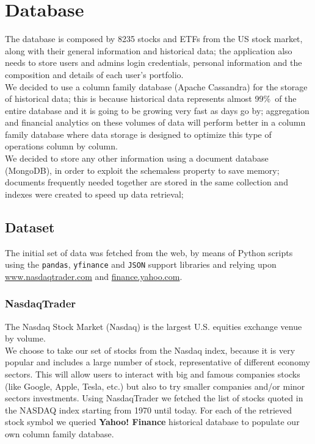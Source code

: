 \chapter{Database}
The database is composed by 8235 stocks and ETFs from the US stock market, along
with their general information and historical data; the application also needs to
store users and admins login credentials, personal information and the
composition and details of each user's portfolio.\\
We decided to use a column family database (Apache Cassandra) for the storage of
historical data; this is because historical data represents almost 99\%\ of
the entire database and it is going to be growing very fast as days go by;
aggregation and financial analytics on these volumes of data will perform better
in a column family database where data storage is designed to optimize this type
of operations column by column.\\
We decided to store any other information using a document database (MongoDB),
in order to exploit the schemaless property to save memory; documents frequently
needed together are stored in the same collection and indexes were created to
speed up data retrieval;
\section{Dataset}
The initial set of data was fetched from the web, by means of Python scripts
using the \texttt{pandas}, \texttt{yfinance} and \texttt{JSON} support libraries
and relying upon \url{www.nasdaqtrader.com} and \url{finance.yahoo.com}.
\subsection{NasdaqTrader}
The Nasdaq Stock Market (Nasdaq) is the largest U.S. equities exchange venue by
volume.\\
We choose to take our set of stocks from the Nasdaq index, because it is very
popular and includes a large number of stock, representative of different
economy sectors. This will allow users to interact with big and famous companies
stocks (like Google, Apple, Tesla, etc.) but also to try smaller companies
and/or minor sectors investments. Using NasdaqTrader we fetched the list of
stocks quoted in the NASDAQ index starting from 1970 until today. For each of
the retrieved stock symbol we queried \textbf{Yahoo! Finance} historical
database to populate our own column family database.
